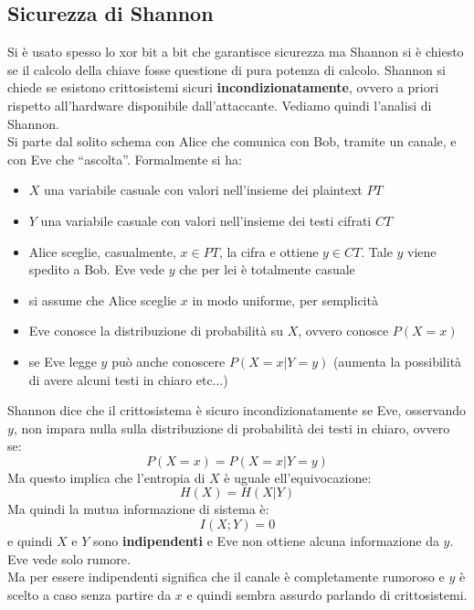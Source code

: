 \documentclass[a4paper,12pt, oneside]{book}
\begin{document}
\subsection{Sicurezza di Shannon}
Si è usato spesso lo xor bit a bit che garantisce sicurezza ma Shannon si è
chiesto se il calcolo della chiave fosse questione di pura potenza di calcolo.
Shannon si chiede se esistono crittosistemi sicuri \textbf{incondizionatamente},
ovvero a priori rispetto all'hardware disponibile dall'attaccante. Vediamo
quindi l'analisi di Shannon.\\
Si parte dal solito schema con Alice che comunica con Bob, tramite un canale, e
con Eve che ``ascolta''. Formalmente si ha:
\begin{itemize}
  \item $X$ una variabile casuale con valori nell'insieme dei plaintext $PT$
  \item $Y$ una variabile casuale con valori nell'insieme dei testi cifrati $CT$
  \item Alice sceglie, casualmente, $x\in PT$, la cifra e ottiene $y\in
  CT$. Tale $y$ viene spedito a Bob. Eve vede $y$ che per lei è totalmente
  casuale
  \item si assume che Alice sceglie $x$ in modo uniforme, per semplicità
  \item Eve conosce la distribuzione di probabilità su $X$, ovvero conosce
  $P(X=x)$ 
  \item se Eve legge $y$ può anche conoscere $P(X=x|Y=y)$ (aumenta la
  possibilità di avere alcuni testi in chiaro etc$\ldots$)
\end{itemize}
Shannon dice che il crittosistema è sicuro incondizionatamente se Eve,
osservando $y$, non impara nulla sulla distribuzione di probabilità dei testi in
chiaro, ovvero se:
\[P(X=x)=P(X=x|Y=y)\]
Ma questo implica che l'entropia di $X$ è uguale ell'equivocazione:
\[H(X)=H(X|Y)\]
Ma quindi la mutua informazione di sistema è:
\[I(X;Y)=0\]
e quindi $X$ e $Y$ sono \textbf{indipendenti} e Eve non ottiene alcuna
informazione da $y$. Eve vede solo rumore.\\
Ma per essere indipendenti significa che il canale è completamente rumoroso e
$y$ è scelto a caso senza partire da $x$ e quindi sembra assurdo parlando di
crittosistemi.
\end{document}
